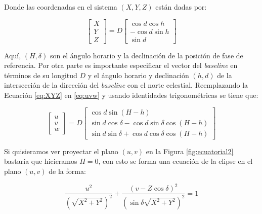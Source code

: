 Donde las coordenadas en el sistema $(X,Y,Z)$ están dadas por:

\begin{equation}
\begin{bmatrix}
X\\
Y\\
Z
\end{bmatrix}
=
D
\begin{bmatrix}
\cos{d}\cos{h}\\
-\cos{d}\sin{h}\\
\sin{d}
\end{bmatrix}
\label{eq:XYZ}
\end{equation} 

Aquí, $(H, \delta)$ son el ángulo horario y la declinación de la posición de fase de referencia. Por otra parte es importante especificar el vector del \textit{baseline} en términos de su longitud $D$ y el ángulo horario y declinación $(h,d)$ de la intersección de la dirección del \textit{baseline} con el norte celestial. Reemplazando la Ecuación \ref{eq:XYZ} en \ref{eq:uvw} y usando identidades trigonométricas se tiene que:


\begin{equation}
\begin{bmatrix}
u\\
v\\
w
\end{bmatrix}
=
D
\begin{bmatrix}
\cos{d}\sin{(H-h)}\\
\sin{d}\cos{\delta}-\cos{d}\sin{\delta}\cos{(H-h)}\\
\sin{d}\sin{\delta}+\cos{d}\cos{\delta}\cos{(H-h)}
\end{bmatrix}
\label{eq:uvw2}
\end{equation} 


Si quisieramos ver proyectar el plano $(u,v)$ en la Figura \ref{fig:ecuatorial2} bastaría que hicieramos $H=0$, con esto se forma una ecuación de la elipse en el plano $(u,v)$ de la forma:

\begin{equation}
\frac{u^2}{(\sqrt{X^{2}+Y^{2}})^2}+\frac{(v-Z\cos{\delta})^2}{(\sin{\delta}\sqrt{X^{2}+Y^{2}})^2} = 1
\label{eq:elipse}
\end{equation}

